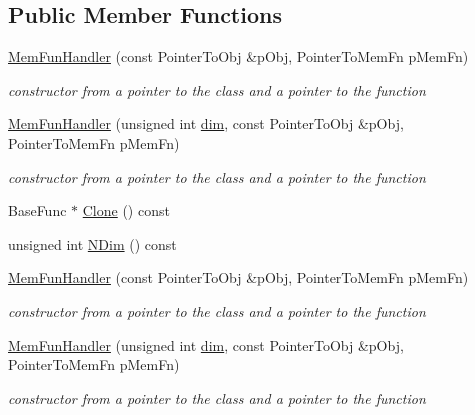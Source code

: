 \subsection*{Public Member Functions}
\begin{DoxyCompactItemize}
\item 
\mbox{\hyperlink{classROOT_1_1Math_1_1MemFunHandler_a714877219c36aab344b3785be06affcc}{Mem\+Fun\+Handler}} (const Pointer\+To\+Obj \&p\+Obj, Pointer\+To\+Mem\+Fn p\+Mem\+Fn)
\begin{DoxyCompactList}\small\item\em constructor from a pointer to the class and a pointer to the function \end{DoxyCompactList}\item 
\mbox{\hyperlink{classROOT_1_1Math_1_1MemFunHandler_ae160c1f60f6681ba29ce9e2bf3654b24}{Mem\+Fun\+Handler}} (unsigned int \mbox{\hyperlink{adat__devel_2lib_2hadron_2irrep__util_8cc_a70b5e28b5bc3d1b63a7435c5fe50b837}{dim}}, const Pointer\+To\+Obj \&p\+Obj, Pointer\+To\+Mem\+Fn p\+Mem\+Fn)
\begin{DoxyCompactList}\small\item\em constructor from a pointer to the class and a pointer to the function \end{DoxyCompactList}\item 
Base\+Func $\ast$ \mbox{\hyperlink{classROOT_1_1Math_1_1MemFunHandler_a71089a87a2f1ca482d176caca602f16c}{Clone}} () const
\item 
unsigned int \mbox{\hyperlink{classROOT_1_1Math_1_1MemFunHandler_a6685da729cc491d0ee9b3857a400d98c}{N\+Dim}} () const
\item 
\mbox{\hyperlink{classROOT_1_1Math_1_1MemFunHandler_a714877219c36aab344b3785be06affcc}{Mem\+Fun\+Handler}} (const Pointer\+To\+Obj \&p\+Obj, Pointer\+To\+Mem\+Fn p\+Mem\+Fn)
\begin{DoxyCompactList}\small\item\em constructor from a pointer to the class and a pointer to the function \end{DoxyCompactList}\item 
\mbox{\hyperlink{classROOT_1_1Math_1_1MemFunHandler_ae160c1f60f6681ba29ce9e2bf3654b24}{Mem\+Fun\+Handler}} (unsigned int \mbox{\hyperlink{adat__devel_2lib_2hadron_2irrep__util_8cc_a70b5e28b5bc3d1b63a7435c5fe50b837}{dim}}, const Pointer\+To\+Obj \&p\+Obj, Pointer\+To\+Mem\+Fn p\+Mem\+Fn)
\begin{DoxyCompactList}\small\item\em constructor from a pointer to the class and a pointer to the function \end{DoxyCompactList}\item 

\end{DoxyCompactItemize}
